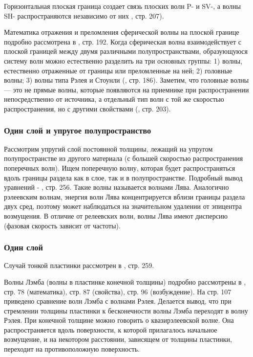 Горизонтальная плоская граница создает связь плоских волн P- и SV-, а волны SH- распространяются независимо от них \cite{aki_richards}, стр. 207).

Математика отражения и преломления сферической волны на плоской границе подробно рассмотрена в \cite{aki_richards}, стр. 192. Когда сферическая волна взаимодействует с плоской границей между двумя различными полупространствами, образующуюся систему волн можно естественно разделить на три основных группы: 1) волны, естественно отраженные от границы или преломленные на ней; 2) головные волны; 3) волны типа Рэлея и Стоунли (\cite{aki_richards}, стр. 186). Заметим, что головные волны — это не прямые волны, которые появляются на приемнике при распространении непосредственно от источника, а отдельный тип волн с той же скоростью распространения, но с другими свойствами (\cite{aki_richards}, стр. 203).


\subsubsection{Один слой и упругое полупространство}

Рассмотрим упругий слой постоянной толщины, лежащий на упругом полупространстве из другого материала (с большей скоростью распространения поперечных волн). Ищем поперечную волну, которая будет распространяться вдоль границы раздела как в слое, так и в полупространстве. Подробный вывод уравнений - \cite{amenadze}, стр. 256. Такие волны называется волнами Лява. Аналогично рэлеевским волнам, энергия волн Лява концентрируется вблизи границы раздела двух сред, поэтому может наблюдаться на значительном удалении от эпицентра возмущения. В отличие от релеевских волн, волны Лява имеют дисперсию (фазовая скорость зависит от частоты).


\subsubsection{Один слой}

Случай тонкой пластинки рассмотрен в \cite{amenadze}, стр. 259. 

Волны Лэмба (волны в пластинке конечной толщины) подробно рассмотрены в \cite{viktorov}, стр. 78 (математика), стр. 87 (свойства), стр. 96 (возбуждение). На стр. 107 приведено сравнение волн Лэмба с волнами Рэлея. Делается вывод, что при стремлении толщины пластинки к бесконечности волны Лэмба переходят в волну Рэлея. При конечной толщине можно говорить о квазирэлеевской волне. Она распространяется вдоль поверхности, к которой прилагалось начальное возмущение, и на некотором расстоянии, зависящем от толщины пластинки, переходит на противоположную поверхность. 


